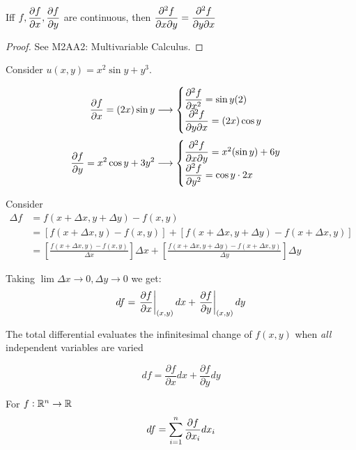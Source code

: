 \documentclass[10pt]{scrartcl}
\begin{document}
\begin{theorem} Iff $f, \dfrac{\partial f}{\partial x}, \dfrac{\partial f}{\partial y}$ are continuous, then 
$\dfrac{\partial^2f}{\partial x\partial y} = \dfrac{\partial^2f}{\partial y\partial x}$
\end{theorem}
\begin{proof}
See M2AA2: Multivariable Calculus.
\end{proof}


\begin{example}
Consider $u(x,y) = x^2\sin y + y^3$. 

\[
\begin{aligned}
  \frac{\partial f}{\partial x} = (2x)\sin y&\longrightarrow \begin{cases}
 \dfrac{\partial^2f}{\partial x^2}= \sin y (2)\\[0.1cm]
 \dfrac{\partial^2f}{\partial y\partial x} = (2x)\cos y
 \end{cases}\\[0.1cm]
   \dfrac{\partial f}{\partial y} = x^2\cos y + 3y^2 &\longrightarrow \begin{cases}
 \dfrac{\partial^2f}{\partial x\partial y} =x^2(\sin y)+6y\\[0.1cm]
\dfrac{\partial^2f}{\partial y^2} = \cos y\cdot 2x
 \end{cases}
\end{aligned}\]
\end{example}

Consider 
\[
\begin{aligned}
  \Delta f &= f(x + \Delta x,y + \Delta y) - f(x,y)\\
  &= [f(x + \Delta x,y) - f(x,y)] + [f(x+\Delta x, y + \Delta y) - f(x + \Delta x,y)]\\
  &= \left[\frac{f(x+\Delta x,y)-f(x,y)}{\Delta x}\right]\Delta x
  + \left[\frac{f(x+\Delta x,y+\Delta y) - f(x+\Delta x,y)}{\Delta y}\right]\Delta y
\end{aligned}
\]

Taking $\lim \Delta x \to 0, \Delta y \to 0$ we get:
\[df = \left.\frac{\partial f}{\partial x}\right|_{(x,y)}dx + \left.\frac{\partial f}{\partial y}\right|_{(x,y)}dy\]


\begin{definition}  The total differential evaluates the infinitesimal change of $f(x,y)$ when \emph{all} independent variables are varied

\[df = \frac{\partial f}{\partial x}dx + \frac{\partial f}{\partial y}dy\]

For $f: \mathbb{R}^n \to \mathbb{R}$
\[df = \sum_{i=1}^n \frac{\partial f}{\partial x_i}dx_i\]
\end{definition}
\end{document}
